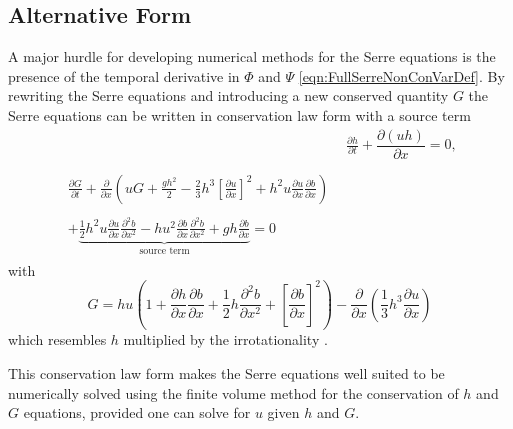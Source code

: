 \subsection{Alternative Form}
A major hurdle for developing numerical methods for the Serre equations is the presence of the temporal derivative in $\Phi$ and $\Psi$ \eqref{eqn:FullSerreNonConVarDef}. By rewriting the Serre equations and introducing a new conserved quantity $G$ \cite{Hank-etal-2010-2034,Zoppou-2014,Li-2014-169} the Serre equations can be written in conservation law form with a source term
\begin{subequations}
	\label{eqn:FullSerreCon}
	\begin{align}
	& \frac{\partial h}{\partial t} + \dfrac{\partial (uh)}{\partial x} = 0 ,\label{eqn:FullSerreConMass}  \\ \nonumber \\
	\begin{split}
	\label{eqn:Serreconsconmom}
	\frac{\partial G}{\partial t}  + \frac{\partial}{\partial x} \left( {u} G + \frac{gh^2}{2} - \frac{2}{3}h^3 \left[\frac{\partial {u}}{\partial x}\right]^2 + h^2 {u}\frac{\partial {u}}{\partial x}\frac{\partial b}{\partial x} \right) \\ \\ +  \underbrace{\frac{1}{2}h^2 {u} \frac{\partial {u}}{\partial x} \frac{\partial^2 b}{\partial x^2}  - h {u}^2\frac{\partial b}{\partial x}\frac{\partial^2 b}{\partial x^2} + gh\frac{\partial b}{\partial x} } _{\text{source term}} = 0
	\end{split}
	\end{align}
\end{subequations}
with
\begin{equation}
\label{defn:SerreEqnConservedQuantity1}
G =  h {u} \left(1 + \frac{\partial h}{\partial x}\frac{\partial b}{\partial x} + \frac{1}{2}h\frac{\partial^2 b}{\partial x^2} + \left[\frac{\partial b}{\partial x}\right]^2 \right) - \frac{\partial}{\partial x}\left(\frac{1}{3}h^3  \frac{\partial {u}}{\partial x}\right)
\end{equation}
which resembles $h$ multiplied by the irrotationality \cite{Choi-Camassa-1999-1,Carter-Cienfuegos-2011-259}.

This conservation law form makes the Serre equations well suited to be numerically solved using the finite volume method for the conservation of $h$ and $G$ equations, provided one can solve for $u$ given $h$ and $G$.

